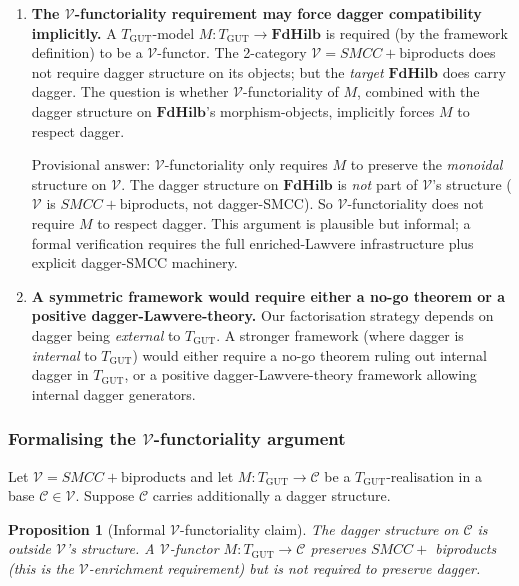 \documentclass[11pt,a4paper]{article}
\theoremstyle{plain}
\newtheorem{proposition}[theorem]{Proposition}
\theoremstyle{definition}
\theoremstyle{remark}
\newcommand{\cat}[1]{\mathbf{#1}}
\newcommand{\FdHilb}{\cat{FdHilb}}
\newcommand{\TGUT}{T_{\mathrm{GUT}}}
\newcommand{\smcc}{SMCC}
\begin{document}
\begin{enumerate}[leftmargin=*]
\item \textbf{The $\mathcal{V}$-functoriality requirement may force dagger compatibility implicitly.} A $\TGUT$-model $M : \TGUT \to \FdHilb$ is required (by the framework definition) to be a $\mathcal{V}$-functor. The 2-category $\mathcal{V} = \smcc + \text{biproducts}$ does not require dagger structure on its objects; but the \emph{target} $\FdHilb$ does carry dagger. The question is whether $\mathcal{V}$-functoriality of $M$, combined with the dagger structure on $\FdHilb$'s morphism-objects, implicitly forces $M$ to respect dagger.

Provisional answer: $\mathcal{V}$-functoriality only requires $M$ to preserve the \emph{monoidal} structure on $\mathcal{V}$. The dagger structure on $\FdHilb$ is \emph{not} part of $\mathcal{V}$'s structure ($\mathcal{V}$ is $\smcc + \text{biproducts}$, not dagger-\smcc). So $\mathcal{V}$-functoriality does not require $M$ to respect dagger. This argument is plausible but informal; a formal verification requires the full enriched-Lawvere infrastructure plus explicit dagger-\smcc{} machinery.

\item \textbf{A symmetric framework would require either a no-go theorem or a positive dagger-Lawvere-theory.} Our factorisation strategy depends on dagger being \emph{external} to $\TGUT$. A stronger framework (where dagger is \emph{internal} to $\TGUT$) would either require a no-go theorem ruling out internal dagger in $\TGUT$, or a positive dagger-Lawvere-theory framework allowing internal dagger generators.

\end{enumerate}

\subsubsection{Formalising the $\mathcal{V}$-functoriality argument}\label{sec:o1:formal}

Let $\mathcal{V} = \smcc + \text{biproducts}$ and let $M : \TGUT \to \mathcal{C}$ be a $\TGUT$-realisation in a base $\mathcal{C} \in \mathcal{V}$. Suppose $\mathcal{C}$ carries additionally a dagger structure.

\begin{proposition}[Informal $\mathcal{V}$-functoriality claim]\label{prop:V-functorial}
The dagger structure on $\mathcal{C}$ is \emph{outside} $\mathcal{V}$'s structure. A $\mathcal{V}$-functor $M : \TGUT \to \mathcal{C}$ preserves $\smcc + $ biproducts (this is the $\mathcal{V}$-enrichment requirement) but is \emph{not required} to preserve dagger.
\end{proposition}
\end{document}
